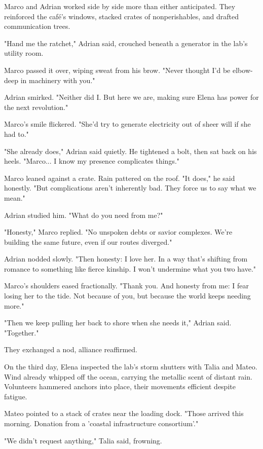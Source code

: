 Marco and Adrian worked side by side more than either anticipated. They reinforced the café's windows, stacked crates of nonperishables, and drafted communication trees.

"Hand me the ratchet," Adrian said, crouched beneath a generator in the lab's utility room.

Marco passed it over, wiping sweat from his brow. "Never thought I'd be elbow-deep in machinery with you."

Adrian smirked. "Neither did I. But here we are, making sure Elena has power for the next revolution."

Marco's smile flickered. "She'd try to generate electricity out of sheer will if she had to."

"She already does," Adrian said quietly. He tightened a bolt, then sat back on his heels. "Marco... I know my presence complicates things."

Marco leaned against a crate. Rain pattered on the roof. "It does," he said honestly. "But complications aren't inherently bad. They force us to say what we mean."

Adrian studied him. "What do you need from me?"

"Honesty," Marco replied. "No unspoken debts or savior complexes. We're building the same future, even if our routes diverged."

Adrian nodded slowly. "Then honesty: I love her. In a way that's shifting from romance to something like fierce kinship. I won't undermine what you two have."

Marco's shoulders eased fractionally. "Thank you. And honesty from me: I fear losing her to the tide. Not because of you, but because the world keeps needing more."

"Then we keep pulling her back to shore when she needs it," Adrian said. "Together."

They exchanged a nod, alliance reaffirmed.

\bigskip

On the third day, Elena inspected the lab's storm shutters with Talia and Mateo. Wind already whipped off the ocean, carrying the metallic scent of distant rain. Volunteers hammered anchors into place, their movements efficient despite fatigue.

Mateo pointed to a stack of crates near the loading dock. "Those arrived this morning. Donation from a 'coastal infrastructure consortium'."

"We didn't request anything," Talia said, frowning.

